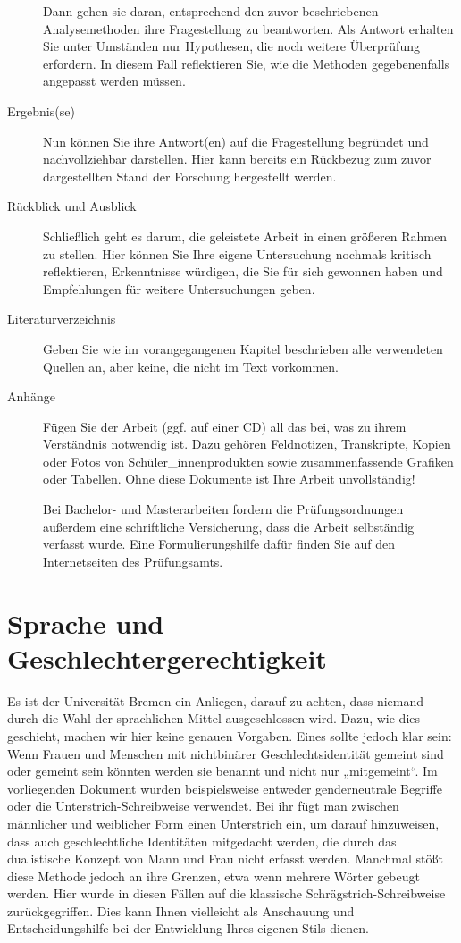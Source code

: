 \documentclass[ngerman,bibliography=totoc,oneside,12pt,a4paper]{scrbook}
\begin{document}
\begin{description}
Dann gehen sie daran, entsprechend den zuvor beschriebenen
Analysemethoden ihre Fragestellung zu beantworten. Als Antwort erhalten
Sie unter Umständen nur Hypothesen, die noch weitere Überprüfung
erfordern. In diesem Fall reflektieren Sie, wie die Methoden
gegebenenfalls angepasst werden müssen.
\item[Ergebnis(se)]
Nun können Sie ihre Antwort(en) auf die Fragestellung begründet und
nachvollziehbar darstellen. Hier kann bereits ein Rückbezug zum zuvor
dargestellten Stand der Forschung hergestellt werden.
\item[Rückblick und Ausblick]
Schließlich geht es darum, die geleistete Arbeit in einen größeren
Rahmen zu stellen. Hier können Sie Ihre eigene Untersuchung nochmals
kritisch reflektieren, Erkenntnisse würdigen, die Sie für sich gewonnen
haben und Empfehlungen für weitere Untersuchungen geben.
\item[Literaturverzeichnis]
Geben Sie wie im vorangegangenen Kapitel beschrieben alle verwendeten
Quellen an, aber keine, die nicht im Text vorkommen.
\item[Anhänge]
Fügen Sie der Arbeit (ggf. auf einer CD) all das bei, was zu ihrem
Verständnis notwendig ist. Dazu gehören Feldnotizen, Transkripte, Kopien
oder Fotos von Schüler\_innenprodukten sowie zusammenfassende Grafiken
oder Tabellen. Ohne diese Dokumente ist Ihre Arbeit unvollständig!

Bei Bachelor- und Masterarbeiten fordern die Prüfungsordnungen außerdem
eine schriftliche Versicherung, dass die Arbeit selbständig verfasst
wurde. Eine Formulierungshilfe dafür finden Sie auf den Internetseiten
des Prüfungsamts.
\end{description}

\section{Sprache und
Geschlechtergerechtigkeit}\label{sprache-und-geschlechtergerechtigkeit}

Es ist der Universität Bremen ein Anliegen, darauf zu achten, dass
niemand durch die Wahl der sprachlichen Mittel ausgeschlossen wird.
Dazu, wie dies geschieht, machen wir hier keine genauen Vorgaben. Eines
sollte jedoch klar sein: Wenn Frauen und Menschen mit nichtbinärer
Geschlechtsidentität gemeint sind oder gemeint sein könnten werden sie
benannt und nicht nur „mitgemeint``. Im vorliegenden Dokument wurden
beispielsweise entweder genderneutrale Begriffe oder die
Unterstrich-Schreibweise verwendet. Bei ihr fügt man zwischen männlicher
und weiblicher Form einen Unterstrich ein, um darauf hinzuweisen, dass
auch geschlechtliche Identitäten mitgedacht werden, die durch das
dualistische Konzept von Mann und Frau nicht erfasst werden. Manchmal
stößt diese Methode jedoch an ihre Grenzen, etwa wenn mehrere Wörter
gebeugt werden. Hier wurde in diesen Fällen auf die klassische
Schrägstrich-Schreibweise zurückgegriffen. Dies kann Ihnen vielleicht
als Anschauung und Entscheidungshilfe bei der Entwicklung Ihres eigenen
Stils dienen.
\end{document}
